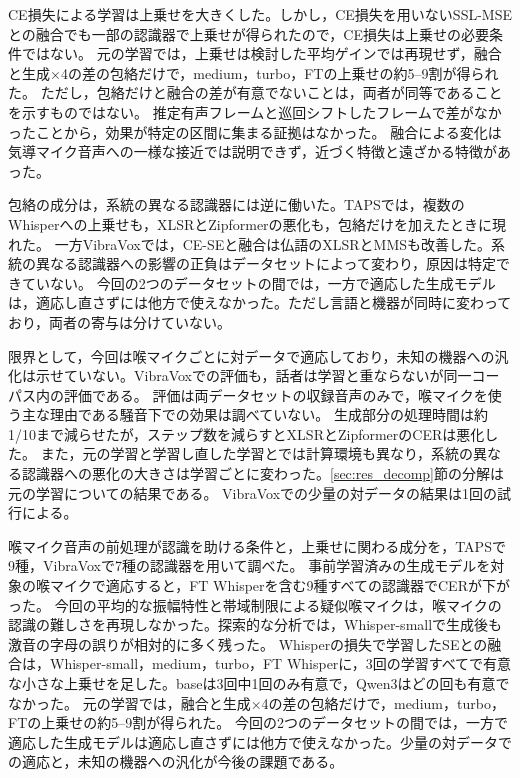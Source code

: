 \documentclass[xelatex,ja=standard,a4paper,twocolumn,10pt]{bxjsarticle}
\makeatletter
\renewcommand{\section}{\@startsection{section}{1}{\z@}{1.0ex plus .3ex}{.5ex}{\normalfont\large\sffamily\bfseries}}
\makeatother
\begin{document}
CE損失による学習は上乗せを大きくした。しかし，CE損失を用いないSSL-MSEとの融合でも一部の認識器で上乗せが得られたので，CE損失は上乗せの必要条件ではない。
元の学習では，上乗せは検討した平均ゲインでは再現せず，融合と生成×4の差の包絡だけで，medium，turbo，FTの上乗せの約5--9割が得られた。
ただし，包絡だけと融合の差が有意でないことは，両者が同等であることを示すものではない。
推定有声フレームと巡回シフトしたフレームで差がなかったことから，効果が特定の区間に集まる証拠はなかった。
融合による変化は気導マイク音声への一様な接近では説明できず，近づく特徴と遠ざかる特徴があった。

包絡の成分は，系統の異なる認識器には逆に働いた。TAPSでは，複数のWhisperへの上乗せも，XLSRとZipformerの悪化も，包絡だけを加えたときに現れた。
一方VibraVoxでは，CE-SEと融合は仏語のXLSRとMMSも改善した。系統の異なる認識器への影響の正負はデータセットによって変わり，原因は特定できていない。
今回の2つのデータセットの間では，一方で適応した生成モデルは，適応し直さずには他方で使えなかった。ただし言語と機器が同時に変わっており，両者の寄与は分けていない。

限界として，今回は喉マイクごとに対データで適応しており，未知の機器への汎化は示せていない。VibraVoxでの評価も，話者は学習と重ならないが同一コーパス内の評価である。
評価は両データセットの収録音声のみで，喉マイクを使う主な理由である騒音下での効果は調べていない。
生成部分の処理時間は約1/10まで減らせたが，ステップ数を減らすとXLSRとZipformerのCERは悪化した。
また，元の学習と学習し直した学習とでは計算環境も異なり，系統の異なる認識器への悪化の大きさは学習ごとに変わった。\ref{sec:res_decomp}節の分解は元の学習についての結果である。
VibraVoxでの少量の対データの結果は1回の試行による。

\section{まとめ}
喉マイク音声の前処理が認識を助ける条件と，上乗せに関わる成分を，TAPSで9種，VibraVoxで7種の認識器を用いて調べた。
事前学習済みの生成モデルを対象の喉マイクで適応すると，FT Whisperを含む9種すべての認識器でCERが下がった。
今回の平均的な振幅特性と帯域制限による疑似喉マイクは，喉マイクの認識の難しさを再現しなかった。探索的な分析では，Whisper-smallで生成後も激音の字母の誤りが相対的に多く残った。
Whisperの損失で学習したSEとの融合は，Whisper-small，medium，turbo，FT Whisperに，3回の学習すべてで有意な小さな上乗せを足した。baseは3回中1回のみ有意で，Qwen3はどの回も有意でなかった。
元の学習では，融合と生成×4の差の包絡だけで，medium，turbo，FTの上乗せの約5--9割が得られた。
今回の2つのデータセットの間では，一方で適応した生成モデルは適応し直さずには他方で使えなかった。少量の対データでの適応と，未知の機器への汎化が今後の課題である。

\footnotesize
\let\oldbibitem\bibitem
\renewcommand{\bibitem}{\setlength{\itemsep}{0pt}\setlength{\parsep}{0pt}\oldbibitem}


\end{document}
